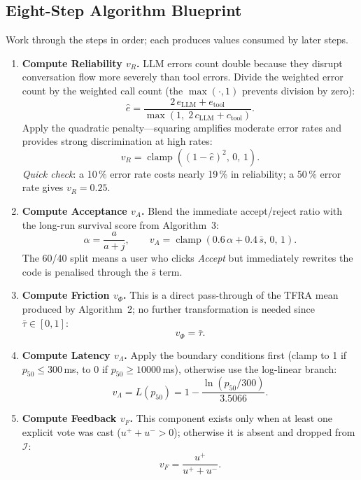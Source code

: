 \documentclass[11pt,a4paper]{article}
\newcommand{\calI}{\mathcal{I}}
\newcommand{\clamp}[3]{\operatorname{clamp}\!\left(#1,\,#2,\,#3\right)}
\begin{document}
\subsection{Eight-Step Algorithm Blueprint}
\label{app:blueprint}

Work through the steps in order; each produces values consumed by later steps.

\begin{enumerate}

\item \textbf{Compute Reliability $v_R$.}
LLM errors count double because they disrupt conversation flow more
severely than tool errors.  Divide the weighted error count by the
weighted call count (the $\max(\cdot,1)$ prevents division by zero):
\[
  \hat{e} = \frac{2\,e_{\text{LLM}} + e_{\text{tool}}}
                 {\max\!\left(1,\;2\,c_{\text{LLM}} + c_{\text{tool}}\right)}.
\]
Apply the quadratic penalty---squaring amplifies moderate error rates
and provides strong discrimination at high rates:
\[
  v_R = \clamp{(1-\hat{e})^2}{0}{1}.
\]
\emph{Quick check}: a 10\,\% error rate costs nearly 19\,\% in reliability;
a 50\,\% error rate gives $v_R = 0.25$.

\item \textbf{Compute Acceptance $v_A$.}
Blend the immediate accept/reject ratio with the long-run survival
score from Algorithm~3:
\[
  \alpha = \frac{a}{a+j}, \qquad
  v_A = \clamp{0.6\,\alpha + 0.4\,\bar{s}}{0}{1}.
\]
The 60/40 split means a user who clicks \emph{Accept} but immediately
rewrites the code is penalised through the $\bar{s}$ term.

\item \textbf{Compute Friction $v_\Phi$.}
This is a direct pass-through of the TFRA mean produced by Algorithm~2;
no further transformation is needed since $\bar{\tau}\in[0,1]$:
\[
  v_\Phi = \bar{\tau}.
\]

\item \textbf{Compute Latency $v_\Lambda$.}
Apply the boundary conditions first (clamp to 1 if $p_{50}\leq300$\,ms,
to 0 if $p_{50}\geq10000$\,ms), otherwise use the log-linear branch:
\[
  v_\Lambda = L(p_{50}) = 1 - \frac{\ln(p_{50}/300)}{3.5066}.
\]

\item \textbf{Compute Feedback $v_F$.}
This component exists only when at least one explicit vote was cast
($u^++u^->0$); otherwise it is absent and dropped from $\calI$:
\[
  v_F = \frac{u^+}{u^+ + u^-}.
\]


\end{enumerate}
\end{document}
